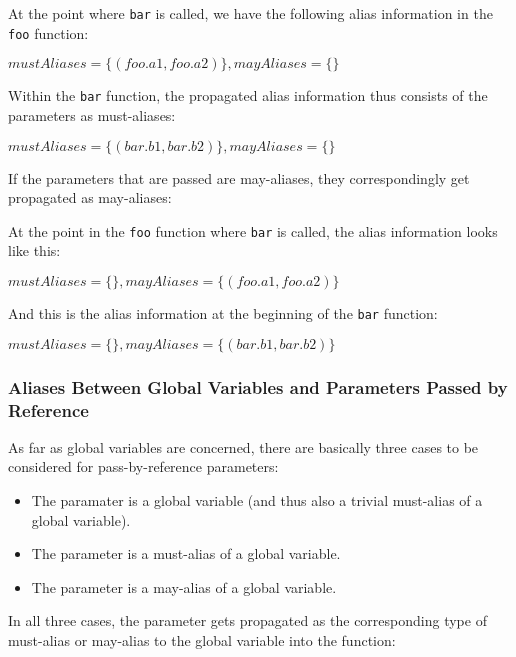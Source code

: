 At the point where \texttt{bar} is called, we have the following alias information in the \texttt{foo} function:

$mustAliases = \{(foo.a1, foo.a2)\}, mayAliases = \{\}$

Within the \texttt{bar} function, the propagated alias information thus consists of the parameters as must-aliases:

$mustAliases = \{(bar.b1, bar.b2)\}, mayAliases = \{\}$


If the parameters that are passed are may-aliases, they correspondingly get propagated as may-aliases:

\begin{phpcode}
function foo() {
  $a1 = 42;
  $a2 = 8;

  if (...) {
    $a2 = &$a1;
  }

  bar($a1, $a2);
  ...
}

function bar(&$b1, &$b2) {
\end{phpcode}

At the point in the \texttt{foo} function where \texttt{bar} is called, the alias information looks like this:

$mustAliases = \{\}, mayAliases = \{(foo.a1, foo.a2)\}$

And this is the alias information at the beginning of the \texttt{bar} function:

$mustAliases = \{\}, mayAliases = \{(bar.b1, bar.b2)\}$



\subsubsection{Aliases Between Global Variables and Parameters Passed by Reference}

As far as global variables are concerned, there are basically three cases to be considered for pass-by-reference parameters:

\begin{itemize}
  \item The paramater is a global variable (and thus also a trivial must-alias of a global variable).
  \item The parameter is a must-alias of a global variable.
  \item The parameter is a may-alias of a global variable.
\end{itemize}

In all three cases, the parameter gets propagated as the corresponding type of must-alias or may-alias to the global variable into the function:

